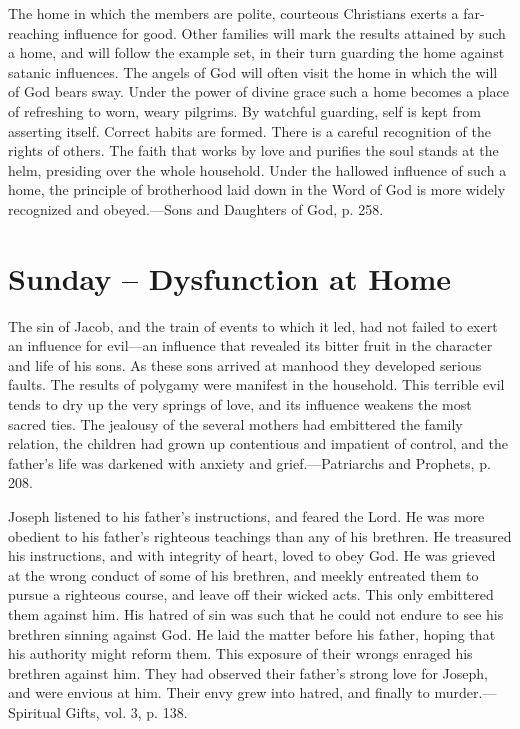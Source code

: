 \documentclass[a4paper, 10pt, twoside, headings=small]{scrartcl}
\begin{document}
\begin{multicols}{2}
The home in which the members are polite, courteous Christians exerts a far-reaching influence for good. Other families will mark the results attained by such a home, and will follow the example set, in their turn guarding the home against satanic influences. The angels of God will often visit the home in which the will of God bears sway. Under the power of divine grace such a home becomes a place of refreshing to worn, weary pilgrims. By watchful guarding, self is kept from asserting itself. Correct habits are formed. There is a careful recognition of the rights of others. The faith that works by love and purifies the soul stands at the helm, presiding over the whole household. Under the hallowed influence of such a home, the principle of brotherhood laid down in the Word of God is more widely recognized and obeyed.—Sons and Daughters of God, p. 258.

\section*{Sunday – Dysfunction at Home}

The sin of Jacob, and the train of events to which it led, had not failed to exert an influence for evil—an influence that revealed its bitter fruit in the character and life of his sons. As these sons arrived at manhood they developed serious faults. The results of polygamy were manifest in the household. This terrible evil tends to dry up the very springs of love, and its influence weakens the most sacred ties. The jealousy of the several mothers had embittered the family relation, the children had grown up contentious and impatient of control, and the father’s life was darkened with anxiety and grief.—Patriarchs and Prophets, p. 208.

Joseph listened to his father’s instructions, and feared the Lord. He was more obedient to his father’s righteous teachings than any of his brethren. He treasured his instructions, and with integrity of heart, loved to obey God. He was grieved at the wrong conduct of some of his brethren, and meekly entreated them to pursue a righteous course, and leave off their wicked acts. This only embittered them against him. His hatred of sin was such that he could not endure to see his brethren sinning against God. He laid the matter before his father, hoping that his authority might reform them. This exposure of their wrongs enraged his brethren against him. They had observed their father’s strong love for Joseph, and were envious at him. Their envy grew into hatred, and finally to murder.—Spiritual Gifts, vol. 3, p. 138.


\end{multicols}
\end{document}
